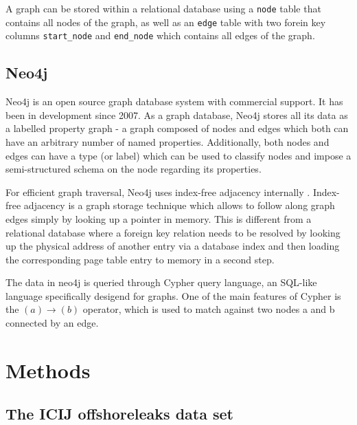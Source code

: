 \documentclass[11pt, a4paper,oneside,chapterprefix=false]{scrbook}
\begin{document}
A graph can be stored within a relational database using a \lstinline{node} table that contains all nodes of the graph, as well as an \lstinline{edge} table with two forein key columns \lstinline{start_node} and \lstinline{end_node} which contains all edges of the graph.

\section{Neo4j}
Neo4j \cite{neo4j} is an open source graph database system with commercial support.
It has been in development since 2007.
As a graph database, Neo4j stores all its data as a labelled property graph - a graph composed of nodes and edges which both can have an arbitrary number of named properties.
Additionally, both nodes and edges can have a type (or label) which can be used to classify nodes and impose a semi-structured schema on the node regarding its properties.

For efficient graph traversal, Neo4j uses index-free adjacency internally \cite{neo4jinaction:chapter11}.
Index-free adjacency is a graph storage technique which allows to follow along graph edges simply by looking up a pointer in memory.
This is different from a relational database where a foreign key relation needs to be resolved by looking up the physical address of another entry via a database index and then loading the corresponding page table entry to memory in a second step.

The data in neo4j is queried through Cypher query language, an SQL-like language specifically desigend for graphs.
One of the main features of Cypher is the $(a)\rightarrow(b)$ operator, which is used to match against two nodes a and b connected by an edge.

\chapter{Methods} \label{chp:methods}


\section{The ICIJ offshoreleaks data set} \label{sec:dataset}
\end{document}
